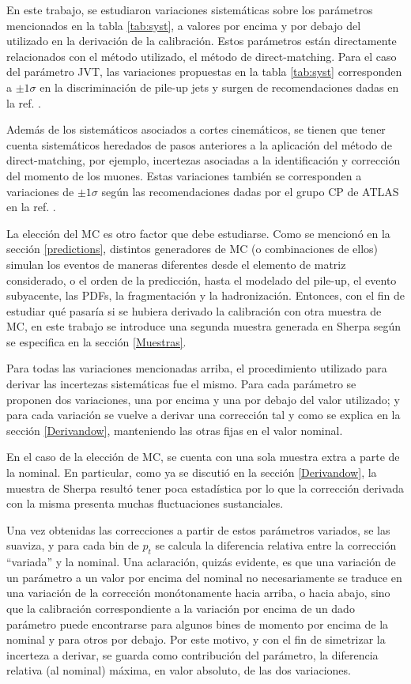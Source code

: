 En este trabajo, se estudiaron variaciones sistemáticas sobre los parámetros mencionados en la tabla \ref{tab:syst}, a valores por encima y por debajo del utilizado en la derivación de la calibración. Estos parámetros están directamente relacionados con el método utilizado, el método de direct-matching. Para el caso del parámetro JVT, las variaciones propuestas en la tabla \ref{tab:syst} corresponden a $\pm 1\sigma$ en la discriminación de pile-up jets y surgen de recomendaciones dadas en la ref. \cite{JVTtool}. 

Además de los sistemáticos asociados a cortes cinemáticos, se tienen que tener cuenta sistemáticos heredados de pasos anteriores a la aplicación del método de direct-matching, por ejemplo, incertezas asociadas a la identificación y corrección del momento de los muones. Estas variaciones también se corresponden a variaciones de $\pm 1\sigma$ según las recomendaciones dadas por el grupo CP de ATLAS en la ref. \cite{MCPGuidelines}. 

La elección del MC es otro factor que debe estudiarse. Como se mencionó en la sección \ref{predictions}, distintos generadores de MC (o combinaciones de ellos) simulan los eventos de maneras diferentes desde el elemento de matriz considerado, o el orden de la predicción, hasta el modelado del pile-up, el evento subyacente, las PDFs, la fragmentación y la hadronización. Entonces, con el fin de estudiar qué pasaría si se hubiera derivado la calibración con otra muestra de MC, en este trabajo se introduce una segunda muestra generada en Sherpa según se especifica en la sección \ref{Muestras}. 

Para todas las variaciones mencionadas arriba, el procedimiento utilizado para derivar las incertezas sistemáticas fue el mismo. Para cada parámetro se proponen dos variaciones, una por encima y una por debajo del valor utilizado; y para cada variación se vuelve a derivar una corrección tal y como se explica en la sección \ref{Derivandow}, manteniendo las otras fijas en el valor nominal.

En el caso de la elección de MC, se cuenta con una sola muestra extra a parte de la nominal. En particular, como ya se discutió en la sección \ref{Derivandow}, la muestra de Sherpa resultó tener poca estadística por lo que la corrección derivada con la misma presenta muchas fluctuaciones sustanciales.

Una vez obtenidas las correcciones a partir de estos parámetros variados, se las suaviza, y para cada bin de $p_t$ se calcula la diferencia relativa entre la corrección ``variada'' y la nominal. Una aclaración, quizás evidente, es que una variación de un parámetro  a un valor por encima del nominal no necesariamente se traduce en una variación de la corrección monótonamente hacia arriba, o hacia abajo, sino que la calibración correspondiente a la variación por encima de un dado parámetro puede encontrarse para algunos bines de momento por encima de la nominal y para otros por debajo. Por este motivo, y con el fin de simetrizar la incerteza a derivar, se guarda como contribución del parámetro, la diferencia relativa (al nominal) máxima, en valor absoluto, de las dos variaciones. 

